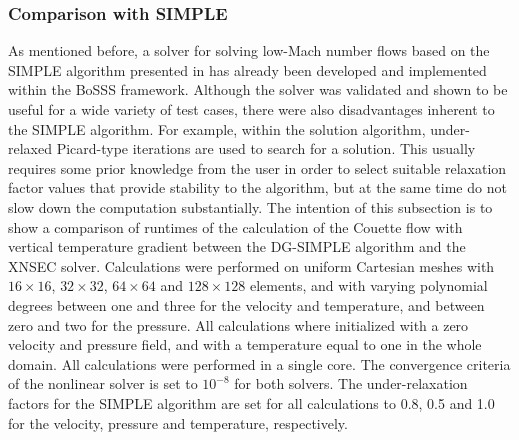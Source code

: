 \subsubsection{Comparison with SIMPLE}
As mentioned before, a solver for solving low-Mach number flows based on the SIMPLE algorithm presented in \textcite{kleinHighorderDiscontinuousGalerkin2016} has already been developed and implemented within the BoSSS framework.
Although the solver was validated and shown to be useful for a wide variety of test cases, there were also disadvantages inherent to the SIMPLE algorithm. For example,
within the solution algorithm, under-relaxed Picard-type iterations are used to search for a solution. This usually requires some prior knowledge from the user in order to select suitable relaxation factor values that provide stability to the algorithm, but at the same time do not slow down the computation substantially. 
The intention of this subsection is to show a comparison of runtimes of the calculation of the Couette flow with vertical temperature gradient between the DG-SIMPLE algorithm \parencite{kleinHighorderDiscontinuousGalerkin2016} and the XNSEC solver. Calculations were performed on uniform Cartesian meshes with $16\times16$, $32\times32$, $64\times64$ and $128\times128$ elements, and with varying polynomial degrees between one and three for the velocity and temperature, and between zero and two for the pressure. All calculations where initialized with a zero velocity and pressure field, and with a temperature equal to one in the whole domain. All calculations were performed in a single core. The convergence criteria of the nonlinear solver is set to $10^{-8}$ for both solvers. The under-relaxation factors for the SIMPLE algorithm are set for all calculations to 0.8, 0.5 and 1.0 for the velocity, pressure and temperature, respectively.

